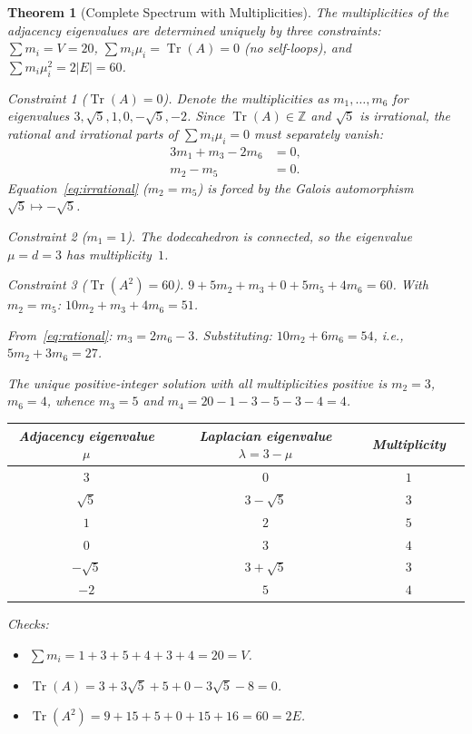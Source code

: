 \documentclass[11pt,a4paper]{article}
\theoremstyle{plain}
\newtheorem{theorem}{Theorem}[section]
\theoremstyle{definition}
\newcommand{\Z}{\mathbb{Z}}
\DeclareMathOperator{\Tr}{Tr}
\begin{document}
\begin{theorem}[Complete Spectrum with Multiplicities]\label{thm:full-spectrum}
The multiplicities of the adjacency eigenvalues are determined uniquely
by three constraints: $\sum m_i = V = 20$, $\sum m_i\mu_i = \Tr(A) = 0$
(no self-loops), and $\sum m_i\mu_i^2 = 2|E| = 60$.

\smallskip
\noindent\textit{Constraint 1} ($\Tr(A) = 0$).
Denote the multiplicities as $m_1, \ldots, m_6$ for eigenvalues
$3, \sqrt{5}, 1, 0, -\sqrt{5}, -2$.  Since $\Tr(A) \in \Z$ and
$\sqrt{5}$ is irrational, the rational and irrational parts of
$\sum m_i \mu_i = 0$ must separately vanish:
\begin{align}
  3m_1 + m_3 - 2m_6 &= 0, \label{eq:rational} \\
  m_2 - m_5 &= 0. \label{eq:irrational}
\end{align}
Equation~\eqref{eq:irrational} ($m_2 = m_5$) is forced by the Galois
automorphism $\sqrt{5} \mapsto -\sqrt{5}$.

\smallskip
\noindent\textit{Constraint 2} ($m_1 = 1$).
The dodecahedron is connected, so the eigenvalue $\mu = d = 3$ has
multiplicity~$1$.

\smallskip
\noindent\textit{Constraint 3} ($\Tr(A^2) = 60$).
$9 + 5m_2 + m_3 + 0 + 5m_5 + 4m_6 = 60$.
With $m_2 = m_5$: $10m_2 + m_3 + 4m_6 = 51$.

From~\eqref{eq:rational}: $m_3 = 2m_6 - 3$.
Substituting: $10m_2 + 6m_6 = 54$, i.e., $5m_2 + 3m_6 = 27$.

The unique positive-integer solution with all multiplicities positive is
$m_2 = 3$, $m_6 = 4$, whence $m_3 = 5$ and
$m_4 = 20 - 1 - 3 - 5 - 3 - 4 = 4$.

\begin{center}
\begin{tabular}{@{}cccc@{}}
\toprule
Adjacency eigenvalue $\mu$ & Laplacian eigenvalue $\lambda = 3 - \mu$ & Multiplicity \\
\midrule
$3$ & $0$ & $1$ \\
$\sqrt{5}$ & $3 - \sqrt{5}$ & $3$ \\
$1$ & $2$ & $5$ \\
$0$ & $3$ & $4$ \\
$-\sqrt{5}$ & $3 + \sqrt{5}$ & $3$ \\
$-2$ & $5$ & $4$ \\
\bottomrule
\end{tabular}
\end{center}

\noindent Checks:
\begin{itemize}[nosep]
  \item $\sum m_i = 1 + 3 + 5 + 4 + 3 + 4 = 20 = V$. \checkmark
  \item $\Tr(A) = 3 + 3\sqrt{5} + 5 + 0 - 3\sqrt{5} - 8 = 0$. \checkmark
  \item $\Tr(A^2) = 9 + 15 + 5 + 0 + 15 + 16 = 60 = 2E$. \checkmark
\end{itemize}
\end{theorem}
\end{document}
